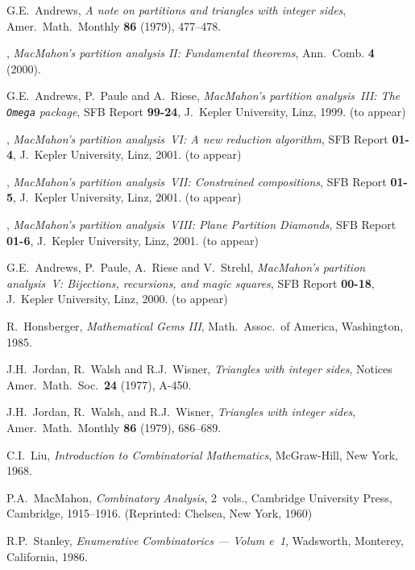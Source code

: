 \documentclass[reqno]{amsart}
\theoremstyle{plain}
\theoremstyle{definition}
\theoremstyle{remark}
\begin{document}
\begin{thebibliography}{99}

 G.E.~Andrews, \textit{A note on partitions
   and triangles with integer sides}, Amer.\ Math.\ Monthly
   {\bf 86} (1979), 477--478.

   \bysame,
   \textit{MacMahon's partition analysis II:
   Fundamental theorems}, Ann.~Comb. {\bf 4} (2000).

   G.E.~Andrews, P.~Paule and A.~Riese, \textit{MacMahon's
   partition analysis~III: The \texttt{Omega} package},
   SFB Report \textbf{99-24}, J.~Kepler University, Linz, 1999.
   (to appear)

   \bysame, \textit{MacMahon's
   partition analysis~VI: A new reduction algorithm},
   SFB Report \textbf{01-4}, J.~Kepler University, Linz, 2001.
   (to appear)

   \bysame, \textit{MacMahon's
   partition analysis~VII: Constrained compositions},
   SFB Report \textbf{01-5}, J.~Kepler University, Linz, 2001.
   (to appear)

   \bysame, \textit{MacMahon's
   partition analysis~VIII: Plane Partition Diamonds},
   SFB Report \textbf{01-6}, J.~Kepler University, Linz, 2001.
   (to appear)

   G.E.~Andrews, P.~Paule, A.~Riese and V.~Strehl, \textit{MacMahon's
   partition analysis~V: Bijections, recursions, and magic squares},
   SFB Report \textbf{00-18}, J.~Kepler University, Linz, 2000.
   (to appear)

 R.~Honsberger, \textit{Mathematical Gems III},
   Math.~Assoc.\ of America, Washington, 1985.

 J.H.~Jordan, R.~Walsh and R.J.~Wisner,
   \textit{Triangles with integer sides}, Notices Amer.\ Math.\ Soc.\
   {\bf 24} (1977), A-450.

 J.H.~Jordan, R.~Walsh, and R.J.~Wisner,
   \textit{Triangles with integer sides}, Amer.\ Math.\ Monthly
   {\bf 86} (1979), 686--689.

 C.I.~Liu, \textit{Introduction to Combinatorial
   Mathematics}, McGraw-Hill, New York, 1968.

 P.A.~MacMahon, \textit{Combinatory Analysis}, 2~vols.,
   Cambridge University Press, Cambridge, 1915--1916. (Reprinted: Chelsea,
   New York, 1960)

 R.P.~Stanley, \textit{Enumerative Combinatorics --- Volum
e~\textup{1}},
   Wadsworth, Monterey, California, 1986.

\end{thebibliography}
\end{document}

